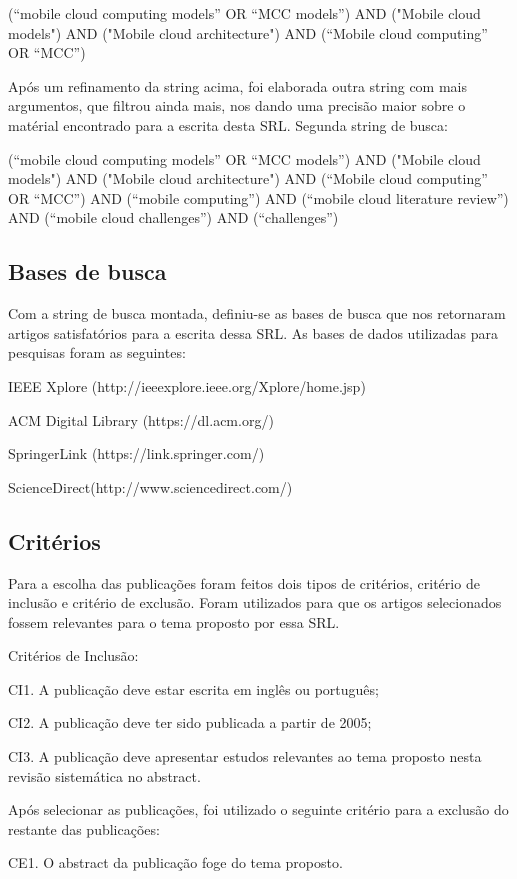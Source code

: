 \documentclass[12pt]{article}
\begin{document}
(“mobile cloud computing models” OR “MCC models”) AND ("Mobile cloud models") AND ("Mobile cloud architecture") AND (“Mobile cloud computing” OR “MCC”)
 
Após um refinamento da string acima, foi elaborada outra string com mais argumentos, que filtrou ainda mais, nos dando uma precisão maior sobre o matérial encontrado para a escrita desta SRL. Segunda string de busca:
 
(“mobile cloud computing models” OR “MCC models”) AND ("Mobile cloud models") AND ("Mobile cloud architecture") AND (“Mobile cloud computing” OR “MCC”) AND (“mobile computing”) AND (“mobile cloud literature review”) AND (“mobile cloud challenges”) AND (“challenges”)

\subsection{Bases de busca}
Com a string de busca montada, definiu-se as bases de busca que nos retornaram artigos satisfatórios para a escrita dessa SRL. As bases de dados utilizadas para pesquisas foram as seguintes:

IEEE Xplore (http://ieeexplore.ieee.org/Xplore/home.jsp)

ACM Digital Library (https://dl.acm.org/)

SpringerLink (https://link.springer.com/)

ScienceDirect(http://www.sciencedirect.com/)

\subsection{Critérios}
Para a escolha das publicações foram feitos dois tipos de critérios,  critério de inclusão e critério de exclusão. Foram utilizados para que os artigos selecionados fossem relevantes para o tema proposto por essa SRL.

Critérios de Inclusão:

CI1. A publicação deve estar escrita em inglês ou português;

CI2. A publicação deve ter sido publicada a partir de 2005;

CI3. A publicação deve apresentar estudos relevantes ao tema proposto nesta revisão sistemática no abstract.

Após selecionar as publicações, foi utilizado o seguinte critério para a exclusão do restante das publicações:

CE1. O abstract da publicação foge do tema proposto.






\end{document}
